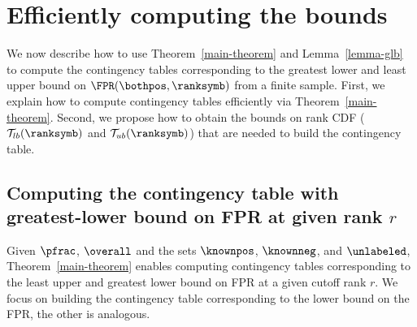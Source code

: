 \section{Efficiently computing the bounds} \label{practical}




We now describe how to use Theorem~\ref{main-theorem} and Lemma~\ref*{lemma-glb} to compute the contingency tables corresponding to the greatest lower and least upper bound on $\FPR(\bothpos,\ranksymb)$ from a finite sample. First, we explain how to compute contingency tables efficiently via Theorem~\ref{main-theorem}. Second, we propose how to obtain the bounds on rank CDF ($\mathcal{T}_{lb}(\ranksymb)$ and $\mathcal{T}_{ub}(\ranksymb)$) that are needed to build the contingency table.  



\subsection{Computing the contingency table with greatest-lower bound on FPR at given rank $r$} \label{contingency}
Given $\pfrac$, $\overall$ and the sets $\knownpos$, $\knownneg$, and $\unlabeled$, Theorem~\ref{main-theorem} enables computing contingency tables corresponding to the least upper and greatest lower bound on FPR at a given cutoff rank $r$. We focus on building the contingency table corresponding to the lower bound on the FPR, the other is analogous. %

